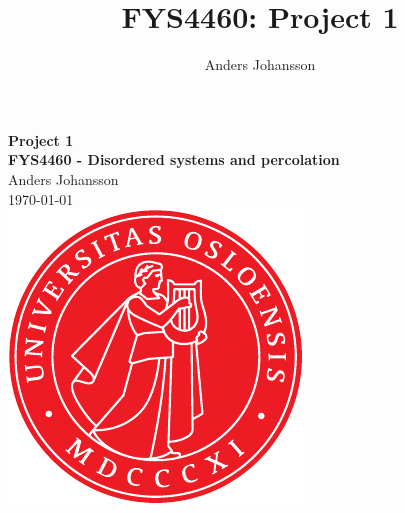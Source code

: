 \documentclass[11pt,british,a4paper]{report}
\begin{document}
\title{FYS4460: Project 1}
\author{Anders Johansson}

\begin{titlepage}
\vspace*{\fill}
\begin{center}
\textsf{
    \Huge \textbf{Project 1}\\\vspace{0.5cm}
    \Large \textbf{FYS4460 - Disordered systems and percolation}\\
    \vspace{8cm}
    Anders Johansson\\
    \today\\
}
\vspace{1.5cm}
\includegraphics{uio.pdf}\\
\vspace*{\fill}
\end{center}
\end{titlepage}
\null
\pagestyle{empty}
\newpage

\pagestyle{fancy}
\setcounter{page}{1}
\end{document}
